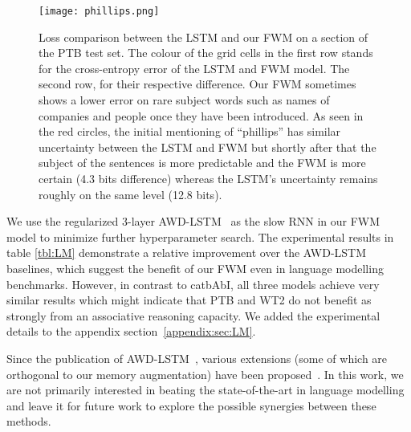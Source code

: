 \documentclass{article} \usepackage{iclr2021_conference,times}
\begin{document}
\begin{figure}[h]
  \centering
\texttt{[image: phillips.png]}
  \vspace{-6pt}
  \caption{
  Loss comparison between the LSTM and our FWM on a section of the PTB test set. The colour of the grid cells in the first row stands for the cross-entropy error of the LSTM and FWM model. The second row, for their respective difference. Our FWM sometimes shows a lower error on rare subject words such as names of companies and people once they have been introduced. As seen in the red circles, the initial mentioning of ``phillips'' has similar uncertainty between the LSTM and FWM but shortly after that the subject of the sentences is more predictable and the FWM is more certain (4.3 bits difference) whereas the LSTM's uncertainty remains roughly on the same level (12.8 bits).}
  \label{fig:phillips}
  \vspace{-5pt}
\end{figure}
We use the regularized 3-layer AWD-LSTM~\citep{merity2018regularizing} as the slow RNN in our FWM model to minimize further hyperparameter search.
The experimental results in table \ref{tbl:LM} demonstrate a relative improvement over the AWD-LSTM baselines, which suggest the benefit of our FWM even in language modelling benchmarks. 
However, in contrast to catbAbI, all three models achieve very similar results which might indicate that PTB and WT2 do not benefit as strongly from an associative reasoning capacity. 
We added the experimental details to the appendix section~\ref{appendix:sec:LM}.

Since the publication of AWD-LSTM~\citep{merity2018regularizing}, various extensions (some of which are orthogonal to our memory augmentation) have been proposed~\citep{pmlr-v80-krause18a,merity2018regularizing,yang2018breaking}.
In this work, we are not primarily interested in beating the state-of-the-art in language modelling and leave it for future work to explore the possible synergies between these methods. 
\end{document}
